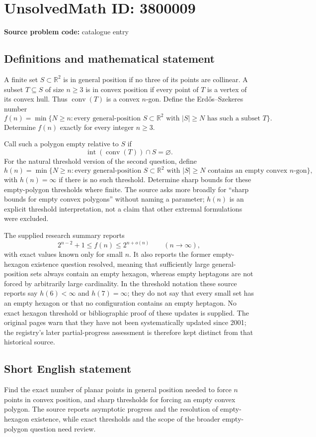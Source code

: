 \documentclass[11pt]{article}
\begin{document}
\section*{UnsolvedMath ID: 3800009}
\textbf{Source problem code:} catalogue entry
\subsection{Definitions and mathematical statement}
A finite set \(S\subset\mathbb R^2\) is in general position if no three of its points are collinear. A subset \(T\subseteq S\) of size \(n\ge3\) is in convex position if every point of \(T\) is a vertex of its convex hull. Thus \(\operatorname{conv}(T)\) is a convex \(n\)-gon. Define the Erd\H{o}s--Szekeres number
\[
 f(n)=\min\{N\ge n:\text{every general-position }S\subset\mathbb R^2
 \text{ with }|S|\ge N\text{ has such a subset }T\}.
\]
Determine \(f(n)\) exactly for every integer \(n\ge3\).

Call such a polygon empty relative to \(S\) if
\[
 \operatorname{int}(\operatorname{conv}(T))\cap S=\varnothing.
\]
For the natural threshold version of the second question, define
\[
 h(n)=\min\{N\ge n:\text{every general-position }S\subset\mathbb R^2
 \text{ with }|S|\ge N\text{ contains an empty convex }n\text{-gon}\},
\]
with \(h(n)=\infty\) if there is no such threshold. Determine sharp bounds for these empty-polygon thresholds where finite. The source asks more broadly for ``sharp bounds for empty convex polygons'' without naming a parameter; \(h(n)\) is an explicit threshold interpretation, not a claim that other extremal formulations were excluded.

The supplied research summary reports
\[
 2^{n-2}+1\le f(n)\le 2^{n+o(n)}\qquad(n\to\infty),
\]
with exact values known only for small \(n\). It also reports the former empty-hexagon existence question resolved, meaning that sufficiently large general-position sets always contain an empty hexagon, whereas empty heptagons are not forced by arbitrarily large cardinality. In the threshold notation these source reports say \(h(6)<\infty\) and \(h(7)=\infty\); they do not say that every small set has an empty hexagon or that no configuration contains an empty heptagon. No exact hexagon threshold or bibliographic proof of these updates is supplied. The original pages warn that they have not been systematically updated since 2001; the registry's later partial-progress assessment is therefore kept distinct from that historical source.
\subsection{Short English statement}
Find the exact number of planar points in general position needed to force \(n\) points in convex position, and sharp thresholds for forcing an empty convex polygon. The source reports asymptotic progress and the resolution of empty-hexagon existence, while exact thresholds and the scope of the broader empty-polygon question need review.
\end{document}
